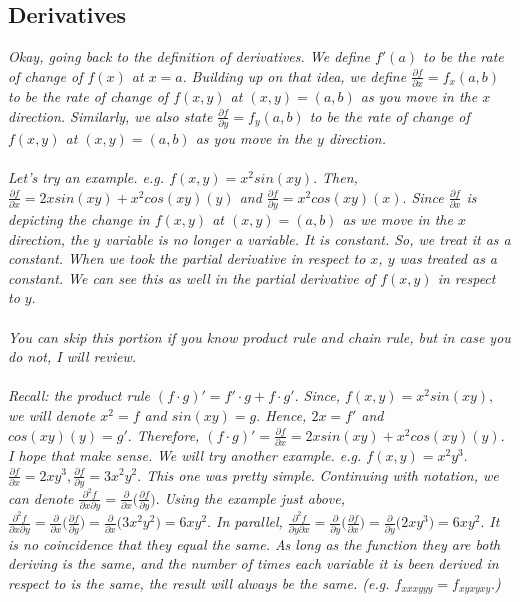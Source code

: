 \documentclass[addpoints]{exam}
\begin{document}
\subsection{
Derivatives
}
\textit{
Okay, going back to the definition of derivatives. We define $f'(a)$ to be the rate of change of $f(x)$ at $x=a.$ Building up on that idea, we define $\frac{\partial f}{\partial x}=f_x(a,b)$ to be the rate of change of $f(x,y)$ at $(x,y) = (a,b)$ as you move in the $x$ direction. Similarly, we also state $\frac{\partial f}{\partial y}=f_y(a,b)$ to be the rate of change of $f(x,y)$ at $(x,y)=(a,b)$ as you move in the $y$ direction.
}\\\\
\textit{
Let's try an example. e.g. $f(x,y) = x^2sin(xy).$ Then, $\frac{\partial f}{\partial x}=2xsin(xy)+x^2cos(xy)(y)$ and $\frac{\partial f}{\partial y} = x^2cos(xy)(x).$ Since $\frac{\partial f}{\partial x}$ is depicting the change in $f(x,y)$ at $(x,y)=(a,b)$ as we move in the $x$ direction, the $y$ variable is no longer a variable. It is constant. So, we treat it as a constant. When we took the partial derivative in respect to $x$, $y$ was treated as a constant. We can see this as well in the partial derivative of $f(x,y)$ in respect to $y.$\\\\
You can skip this portion if you know product rule and chain rule, but in case you do not, I will review.\\\\
Recall: the product rule $(f\cdot g)'=f'\cdot g+f\cdot g'.$ Since, $f(x,y) = x^2sin(xy),$ we will denote $x^2=f$ and $sin(xy)=g.$ Hence, $2x=f'$ and $cos(xy)(y)=g'.$ Therefore, $(f\cdot g)'=\frac{\partial f}{\partial x}=2xsin(xy)+x^2cos(xy)(y).$ I hope that make sense.
}
\textit{
We will try another example. e.g. $f(x,y)=x^2y^3.$ $\frac{\partial f}{\partial x}=2xy^3, \frac{\partial f}{\partial y}=3x^2y^2.$ This one was pretty simple.
}
\textit{
Continuing with notation, we can denote $\frac{\partial ^2f}{\partial x\partial y}=\frac{\partial}{\partial x}\Big(\frac{\partial f}{\partial y}\Big).$ Using the example just above, $\frac{\partial ^2f}{\partial x\partial y}=\frac{\partial}{\partial x}\Big(\frac{\partial f}{\partial y}\Big)=\frac{\partial}{\partial x}\Big(3x^2y^2\Big)=6xy^2.$ In parallel, $\frac{\partial^2f}{\partial y \partial x}=\frac{\partial}{\partial y}\Big(\frac{\partial f}{\partial x}\Big)=\frac{\partial}{\partial y}\Big(2xy^3\Big)=6xy^2.$ It is no coincidence that they equal the same. As long as the function they are both deriving is the same, and the number of times each variable it is been derived in respect to is the same, the result will always be the same. (e.g. $f_{xxxyyy}=f_{xyxyxy}.$)
}
\end{document}
